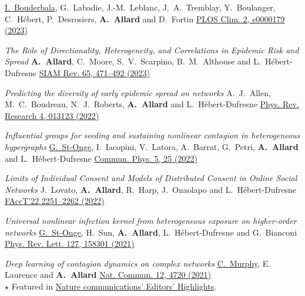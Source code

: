 \documentclass[11pt]{article}
\makeatletter
\newcommand{\reversearabic}[1]{\expandafter\@reversearabic\csname c@#1\endcsname}
\newcommand{\@reversearabic}[1]{%
  \number\numexpr\getrefnumber{this@etaremune@\romannumeral\c@etaremune}-#1+1\relax
}
\newcounter{etaremune}
\newenvironment{etaremune}[1][]{%
  \stepcounter{etaremune}%
  \begin{enumerate}[label=\reversearabic*.,#1]%
}{%
  \edef\@currentlabel{\the\csname c@\@enumctr\endcsname}%
  \label{this@etaremune@\romannumeral\c@etaremune}%
  \end{enumerate}%
}
\makeatother
\begin{document}
\begin{etaremune}[itemsep=0.5em, label={[A\reversearabic*]}]
{  \uline{I.~Bouderbala}, G.~Labadie, J.-M.~Leblanc, J.~A.~Tremblay, Y.~Boulanger, C.~Hébert, P.~Desrosiers, \textbf{A.~Allard} and D.~Fortin\split
  \href{https://doi.org/10.1371/journal.pclm.0000179}{PLOS Clim. 2, e0000179 (2023)}}
%
  \item \parbox[t]{\textwidth-30pt}{\textit{The Role of Directionality, Heterogeneity, and Correlations in Epidemic Risk and Spread}\split
  \textbf{A.~Allard}, C.~Moore, S.~V.~Scarpino, B.~M.~Althouse and L.~H\'ebert-Dufresne\split
  \href{https://doi.org/10.1137/20m1383811}{SIAM Rev. 65, 471--492 (2023)}}
%
  \item \parbox[t]{\textwidth-30pt}{\textit{Predicting the diversity of early epidemic spread on networks}\split
  A.~J.~Allen, M.~C.~Boudreau, N.~J.~Roberts, \textbf{A.~Allard} and L.~H\'ebert-Dufresne\split
  \href{https://doi.org/10.1103/PhysRevResearch.4.013123}{Phys. Rev. Research 4, 013123 (2022)}}
%
  \item \parbox[t]{\textwidth-30pt}{\textit{Influential groups for seeding and sustaining nonlinear contagion in heterogeneous hypergraphs}\split
  \uline{G.~St-Onge}, I.~Iacopini, V.~Latora, A.~Barrat, G.~Petri, \textbf{A.~Allard} and L.~H\'ebert-Dufresne\split
  \href{https://doi.org/10.1038/s42005-021-00788-w}{Commun. Phys. 5, 25 (2022)}}
%
  \item \parbox[t]{\textwidth-30pt}{\textit{Limits of Individual Consent and Models of Distributed Consent in Online Social Networks}\split
  J.~Lovato, \textbf{A.~Allard}, R.~Harp, J.~Onaolapo and L.~H\'ebert-Dufresne\split
  \href{https://doi.org/10.1145/3531146.3534640}{FAccT'22 2251--2262 (2022)}}
%
  \item \parbox[t]{\textwidth-30pt}{\textit{Universal nonlinear infection kernel from heterogeneous exposure on higher-order networks}\split
  \uline{G.~St-Onge}, H.~Sun, \textbf{A.~Allard}, L.~H\'ebert-Dufresne and G.~Bianconi\split
  \href{https://doi.org/10.1103/PhysRevLett.127.158301}{Phys. Rev. Lett. 127, 158301 (2021)}}
%
  \item \parbox[t]{\textwidth-30pt}{\textit{Deep learning of contagion dynamics on complex networks}\split
  \uline{C.~Murphy}, E. Laurence and \textbf{A.~Allard}\split
  \href{https://doi.org/10.1038/s41467-021-24732-2}{Nat. Commun. 12, 4720 (2021)}\\
  {\footnotesize $\star$ Featured in \href{https://www.nature.com/ncomms/editorshighlights}{Nature communications' Editors' Highlights}.}}

\end{etaremune}
\end{document}
